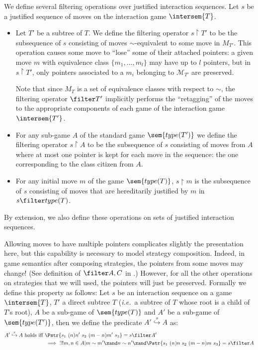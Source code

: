 \begin{definition}[Filtering] We define several filtering operations
over justified interaction sequences. Let $s$ be a justified
sequence of moves on the interaction game $\intersem{T}$.
\begin{itemize}
\item  Let $T'$ be a subtree of $T$. We define the
filtering operator $s\upharpoonright T'$ to be the subsequence
of $s$ consisting of moves $\sim$-equivalent to some move in
$M_{T'}$. This operation causes some move to ``lose'' some of
their attached pointers: a given move $m$ with equivalence class
$\{m_1, \ldots, m_l \}$ may have up to $l$ pointers, but in
$s\upharpoonright T'$, only pointers associated to a $m_i$
belonging to $\mathcal{M}_{T'}$ are preserved.

Note that since $M_T$ is a set of equivalence classes with
respect to $\sim$, the filtering operator $\filter T'$
implicitly performs the ``retagging'' of the moves to the
appropriate components of each game of the interaction game
$\intersem{T'}$.

\item  For any sub-game $A$ of the standard game $\sem{type(T')}$ we
define the filtering operator $s\upharpoonright A$ to be the
subsequence of $s$ consisting of moves from $A$ where at most
one pointer is kept for each move in the sequence: the one
corresponding to the class citizen from $A$.

\item For any initial move $m$ of the game $\sem{type(T)}$, $s
\upharpoonright m$ is the subsequence of $s$ consisting of moves
that are hereditarily justified by $m$ in $s \filter type(T)$.
\end{itemize}
By extension, we also define these operations on sets of justified
interaction sequences.
\end{definition}

Allowing moves to have multiple pointers complicates slightly the
presentation here, but this capability is necessary to model
strategy composition. Indeed, in game semantics after composing
strategies, the pointers from some moves may change! (See definition
of $\filter A,C$ in \cite{abramsky:game-semantics-tutorial}.)
However, for all the other operations on strategies that we will
used, the pointers will just be preserved. Formally we define this
property as follows: Let $s$ be an  interaction sequence on a game
$\intersem{T}$, $T'$ a direct subtree $T$ ({\it i.e.}~a subtree of
$T$ whose root is a child of $T$'s root), $A$ be a sub-game of
$\sem{type(T)}$ and $A'$ be a sub-game of $\sem{type(T')}$, then we
define the predicate $A'\stackrel{s}\hookrightarrow A$ as:
\begin{align*}
 A'\stackrel{s}\hookrightarrow A \mbox{ holds iff } &
 \Pstr{s_1\ (n){n'}\ s_2\ (m-n){m'}\ s_3 } = s\filter A'  \\
 & \implies \exists! m,n \in A | m \sim m' \zand n \sim n' \zand \Pstr{s_1\
(n){n}\  s_2\ (m-n){m}\ s_3} = s\filter A
\end{align*}

